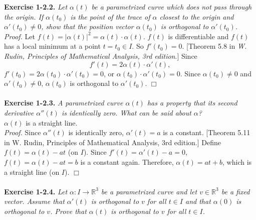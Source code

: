 \documentclass{article}
\begin{document}
\textbf{Exercise 1-2.2.}
\emph{Let $\alpha(t)$ be a parametrized curve which does not pass through the origin.
If $\alpha(t_0)$ is the point of the trace of $\alpha$ closest to the origin
and $\alpha'(t_0) \neq 0$, show that the position vector $\alpha(t_0)$ is
orthogonal to $\alpha'(t_0)$.} \\

\emph{Proof.}
Let $f(t) = |\alpha(t)|^2 = \alpha(t) \cdot \alpha(t)$.
$f(t)$ is differentiable and $f(t)$ has a local minimum at a point $t = t_0 \in I$.
So $f'(t_0) = 0$. [Theorem 5.8 in \emph{W. Rudin, Principles of Mathematical Analysis, 3rd edition}.]
Since
$$f'(t) = 2 \alpha(t) \cdot \alpha'(t),$$
$f'(t_0) = 2 \alpha(t_0) \cdot \alpha'(t_0) = 0$,
or $\alpha(t_0) \cdot \alpha'(t_0) = 0$.
Since $\alpha(t_0) \neq 0$ and $\alpha'(t_0) \neq 0$,
$\alpha(t_0)$ is orthogonal to $\alpha'(t_0)$.
$\Box$ \\\\






\textbf{Exercise 1-2.3.}
\emph{A parametrized curve $\alpha(t)$ has a property that its second derivative
$\alpha''(t)$ is identically zero.
What can be said about $\alpha$?} \\

$\alpha(t)$ is a straight line. \\

\emph{Proof.}
Since $\alpha''(t)$ is identically zero,
$\alpha'(t) = a$ is a constant.
[Theorem 5.11 in W. Rudin, Principles of Mathematical Analysis, 3rd edition.]
Define $f(t) = \alpha(t) - at$ (on $I$).
Since $f'(t) = \alpha'(t) - a = 0$,
$f(t) = \alpha(t) - at = b$ is a constant again.
Therefore, $\alpha(t) = at+b$, which is a straight line (on $I$).
$\Box$ \\\\






\textbf{Exercise 1-2.4.}
\emph{Let $\alpha: I \to \mathbb{R}^3$ be a parametrized curve and
let $v \in \mathbb{R}^3$ be a fixed vector.
Assume that $\alpha'(t)$ is orthogonal to $v$ for all $t \in I$
and that $\alpha(0)$ is orthogonal to $v$.
Prove that $\alpha(t)$ is orthogonal to $v$ for all $t \in I$.} \\
\end{document}
